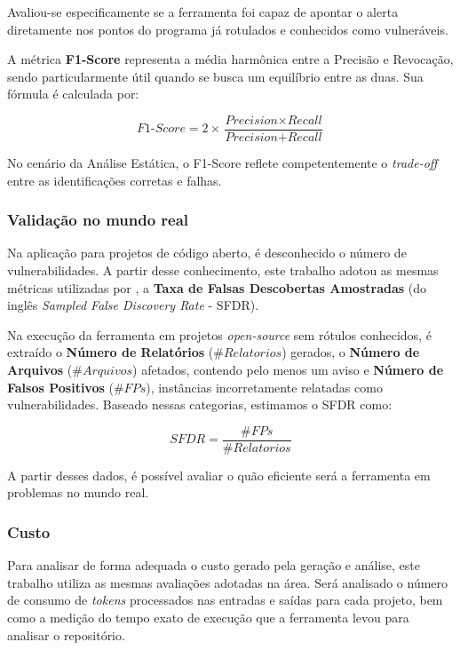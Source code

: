 \documentclass[
    12pt,                %
    openright,           %
    oneside,             %
    a4paper,             %
    english,             %
    brazil               %
]{abntex2}
\begin{document}
\begin{itemize}
\vspace{\onelineskip}
\par
Avaliou-se especificamente se a ferramenta foi capaz de apontar o alerta diretamente nos pontos do programa já rotulados e conhecidos como vulneráveis.
\par
A métrica \textbf{F1-Score} representa a média harmônica entre a Precisão e Revocação, sendo particularmente útil quando se busca um equilíbrio entre as duas.
Sua fórmula é calculada por:

\begin{equation}
  \textit{F1-Score} = 2 \times \frac{\textit{Precision} \times \textit{Recall}}{\textit{Precision} + \textit{Recall}}
\end{equation}

\vspace{\onelineskip}
\par
No cenário da Análise Estática, o F1-Score reflete competentemente o \textit{trade-off} entre as identificações corretas e falhas.

\subsubsection{Validação no mundo real}
\label{sec:validademundoreal}
\par
Na aplicação para projetos de código aberto, é desconhecido o número de vulnerabilidades.
A partir desse conhecimento, este trabalho adotou as mesmas métricas utilizadas por , a \textbf{Taxa de Falsas Descobertas Amostradas} (do inglês \textit{Sampled False Discovery Rate} - SFDR).
\par
Na execução da ferramenta em projetos \textit{open-source} sem rótulos conhecidos, é extraído o \textbf{Número de Relatórios} ($\#Relatorios$) gerados, o \textbf{Número de Arquivos} ($\#Arquivos$) afetados, contendo pelo menos um aviso e \textbf{Número de Falsos Positivos} ($\#FPs$), instâncias incorretamente relatadas como vulnerabilidades.
Baseado nessas categorias, estimamos o SFDR como:

\begin{equation}
  SFDR = \frac{\#FPs}{\#Relatorios}
\end{equation}

\vspace{\onelineskip}
A partir desses dados, é possível avaliar o quão eficiente será a ferramenta em problemas no mundo real.

\subsubsection{Custo}
\label{sec:custo}
\par
Para analisar de forma adequada o custo gerado pela geração e análise, este trabalho utiliza as mesmas avaliações adotadas na área.
Será analisado o número de consumo de \textit{tokens} processados nas entradas e saídas para cada projeto, bem como a medição do tempo exato de execução que a ferramenta levou para analisar o repositório.


\end{itemize}
\end{document}
